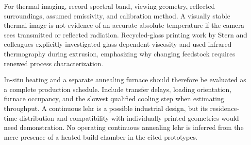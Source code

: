 For thermal imaging, record spectral band, viewing geometry, reflected surroundings, assumed emissivity, and calibration method. A visually stable thermal image is not evidence of an accurate absolute temperature if the camera sees transmitted or reflected radiation. Recycled-glass printing work by Stern and colleagues explicitly investigated glass-dependent viscosity and used infrared thermography during extrusion, emphasizing why changing feedstock requires renewed process characterization.\cite{acad_stern2024}

In-situ heating and a separate annealing furnace should therefore be evaluated as a complete production schedule. Include transfer delays, loading orientation, furnace occupancy, and the slowest qualified cooling step when estimating throughput. A continuous lehr is a possible industrial design, but its residence-time distribution and compatibility with individually printed geometries would need demonstration. No operating continuous annealing lehr is inferred from the mere presence of a heated build chamber in the cited prototypes.
